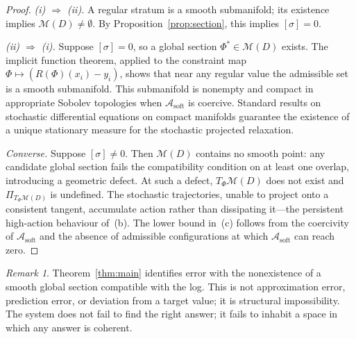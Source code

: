 \documentclass[12pt,oneside]{article}
\theoremstyle{plain}
\theoremstyle{definition}
\theoremstyle{remark}
\newtheorem{remark}[theorem]{Remark}
\newcommand{\M}{\mathcal{M}}
\newcommand{\D}{D}
\newcommand{\Asoft}{\mathcal{A}_{\mathrm{soft}}}
\begin{document}
\begin{proof}
\noindent\emph{(i) $\Rightarrow$ (ii).}
A regular stratum is a smooth submanifold; its existence implies $\M(\D)
\neq\emptyset$. By Proposition~\ref{prop:section}, this implies $[\sigma] = 0$.

\medskip\noindent\emph{(ii) $\Rightarrow$ (i).}
Suppose $[\sigma] = 0$, so a global section $\Phi^* \in \M(\D)$ exists. The
implicit function theorem, applied to the constraint map
$\Phi \mapsto (R(\Phi)(x_i) - y_i)$, shows that near any regular value the
admissible set is a smooth submanifold. This submanifold is nonempty and
compact in appropriate Sobolev topologies when $\Asoft$ is coercive. Standard
results on stochastic differential equations on compact manifolds guarantee the
existence of a unique stationary measure for the stochastic projected relaxation.

\medskip\noindent\emph{Converse.}
Suppose $[\sigma] \neq 0$. Then $\M(\D)$ contains no smooth point: any candidate
global section fails the compatibility condition on at least one overlap,
introducing a geometric defect. At such a defect, $T_\Phi\M(\D)$ does not exist
and $\Pi_{T_\Phi\M(\D)}$ is undefined. The stochastic trajectories, unable to
project onto a consistent tangent, accumulate action rather than dissipating
it---the persistent high-action behaviour of~(b). The lower bound in~(c) follows
from the coercivity of $\Asoft$ and the absence of admissible configurations at
which $\Asoft$ can reach zero.
\end{proof}

\begin{remark}
Theorem~\ref{thm:main} identifies error with the nonexistence of a smooth global
section compatible with the log. This is not approximation error, prediction
error, or deviation from a target value; it is structural impossibility. The
system does not fail to find the right answer; it fails to inhabit a space in
which any answer is coherent.
\end{remark}
\end{document}

